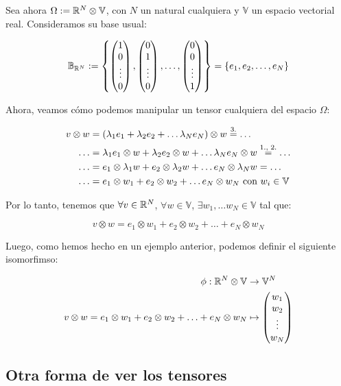 \begin{ejemplo}
    Sea ahora $\Omega := \mathbb{R}^N \otimes \mathbb{V}$, con $N$ un natural cualquiera y $\mathbb{V}$ un espacio vectorial real. Consideramos su base usual:

    $$\mathbb{B}_{\mathbb{R}^N} := \left\{\begin{pmatrix} 1 \\ 0 \\ \vdots \\ 0 \end{pmatrix}, \begin{pmatrix} 0 \\ 1 \\ \vdots \\ 0 \end{pmatrix}, \ldots, \begin{pmatrix} 0 \\ 0 \\ \vdots \\ 1 \end{pmatrix} \right\} = \left\{e_1, e_2, \ldots, e_N \right\}$$

    Ahora, veamos cómo podemos manipular un tensor cualquiera del espacio $\Omega$:

    \begin{equation}
    \begin{split}
        v \otimes w &= (\lambda_1 e_1 + \lambda_2 e_2 + \ldots \lambda_N e_N) \otimes w \stackrel{\text{3.}}{=} \ldots \\
        \ldots &= \lambda_1 e_1 \otimes w + \lambda_2 e_2 \otimes w+ \ldots \lambda_N e_N \otimes w \stackrel{\text{1., 2.}}{=} \ldots \\
        \ldots &= e_1 \otimes \lambda_1 w + e_2 \otimes \lambda_2 w + \ldots e_N \otimes \lambda_N w = \ldots \\
        \ldots &= e_1 \otimes w_1 + e_2 \otimes w_2 + \ldots e_N \otimes w_N \text{   con   } w_i \in \mathbb{V}
    \end{split}
    \end{equation}

    Por lo tanto, tenemos que $\forall v \in \mathbb{R}^N$, $\forall w \in \mathbb{V}$, $\exists w_1, \ldots w_N \in \mathbb{V}$ tal que:

    $$v \otimes w = e_1 \otimes w_1 + e_2 \otimes w_2 + \ldots + e_N \otimes w_N$$

    Luego, como hemos hecho en un ejemplo anterior, podemos definir el siguiente isomorfimso:

    \begin{equation}
    \begin{split}
        \phi: \mathbb{R}^N \otimes \mathbb{V} &\to \mathbb{V}^N \\
        v \otimes w = e_1 \otimes w_1 + e_2 \otimes w_2 + \ldots + e_N \otimes w_N &\mapsto \begin{pmatrix} w_1 \\ w_2 \\ \vdots \\ w_N \end{pmatrix}
    \end{split}
    \end{equation}


\end{ejemplo}

\subsection{Otra forma de ver los tensores} \label{sec:otra_forma_tensores}

